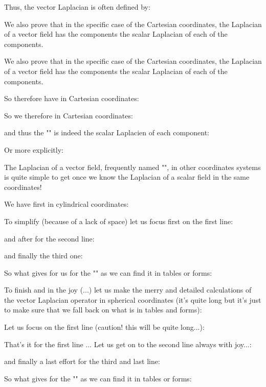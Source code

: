 	Thus, the vector Laplacian is often defined by:
	
	We also prove that in the specific case of the Cartesian coordinates, the Laplacian of a vector field has the components the scalar Laplacian of each of the components.
	
	We also prove that in the specific case of the Cartesian coordinates, the Laplacian of a vector field has the components the scalar Laplacian of each of the components.
	
	So therefore have in Cartesian coordinates:
	
	So we therefore in Cartesian coordinates:
	
	and thus the "" is indeed the scalar Laplacien of each component:
	
	Or more explicitly:
	
	The Laplacian of a vector field, frequently named "", in other coordinates systems is quite simple to get once we know the Laplacian of a scalar field in the same coordinates!
	
	We have first in cylindrical coordinates:
	
	To simplify (because of a lack of space) let us focus first on the first line:
	
	and after for the second line:
	
	and finally the third one:
	
	So what gives for us for the "" as we can find it in tables or forms:
	
	To finish and in the joy (...) let us make the merry and detailed calculations of the vector Laplacian operator in spherical coordinates (it's quite long but it's just to make sure that we fall back on what is in tables and forms):
	
	Let us focus on the first line (caution! this will be quite long...):
	
	\pagebreak
	
	That's it for the first line ... Let us get on to the second line always with joy...:
	
	
	\pagebreak
	and finally a last effort for the third and last line:
	

	\pagebreak
	
	So what gives for the "" as we can find it in tables or forms:
	
